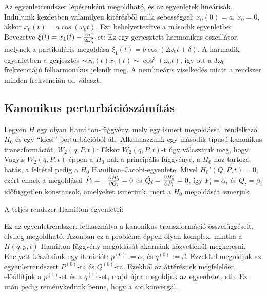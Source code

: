    Az egyenletrendszer lépésenként megoldható, és az egyenletek lineárisak. Induljunk kezdetben valamilyen kitérésből nulla sebességgel: $x_0(0)=a$, $\dot x_0=0$, akkor $x_0(t)=a\cos(\omega_0 t)$. Ezt behelyettesítve a második egyenletbe:
   Bevezetve $\xi(t)=x_1(t)-\frac{\varepsilon a^2}{2\omega_0^2}$-et:
   Ez egy gerjesztett harmonikus oszcillátor, melynek a partikuláris megoldása $\xi_1(t)=b\cos(2\omega_0 t+\delta)$. A harmadik egyenletben a gerjesztés $\sim x_0(t)x_1(t)\sim\cos^3(\omega_0 t)$, így ott a $3\omega_0$ frekvenciájú felharmonikus jelenik meg. A nemlineáris viselkedés miatt a rendszer minden frekvencián ad választ. 
   
  \subsection{Kanonikus perturbációszámítás}\label{ss:11-kanonikusperturbacioszamitas}
   
   Legyen $H$ egy olyan Hamilton-függvény, mely egy ismert megoldással rendelkező $H_0$ és egy ``kicsi'' perturbációból áll:
   Alkalmazzunk egy második típusú kanonikus transzformációt, $W_2(q,P,t)$:
   Ekkor
   $W_2(q,P,t)$-t úgy választjuk meg, hogy 
   Vagyis $W_2(q,P,t)$ éppen a $H_0$-nak a principális függvénye, a $H_0$-hoz tartozó hatás, a feltétel pedig a $H_0$ Hamilton--Jacobi-egyenlete. Mivel $H_0'(Q,P,t)=0$, ezért ennek a megoldásai $\dot P_i=-\frac{\partial H'_0}{\partial Q_i}=0$ és $\dot Q_i=\frac{\partial H'_0}{\partial P_i}=0$, így $P_i=\alpha_i$ és $Q_i=\beta_i$ időfüggetlen konstansok, amelyeket ismerünk, mert a $H_0$ megoldását ismerjük. 
   
   A teljes rendszer Hamilton-egyenletei:
   
   Ez az egyenletrendszer, felhasználva a kanonikus transzformáció összefüggéseit, elvileg megoldható. Azonban ez a probléma éppen olyan komplex, mintha a $H(q,p,t)$ Hamilton-függvény megoldását akarnánk közvetlenül megkeresni. Ehelyett készítsünk egy iterációt: $p^{(0)}:=\alpha$, és $q^{(0)}:=\beta$. Ezzekkel megoldjuk az egyenletrendszert $P^{(0)}$-ra és $Q^{(0)}$-ra. Ezekből az áttérésnek megfelelően előállítjuk a $p^{(1)}$-et és a $q^{(1)}$-et, majd újra megoldjuk az egyenletet, stb. Ez után pedig reménykedünk benne, hogy a sor konvergál. 
   
